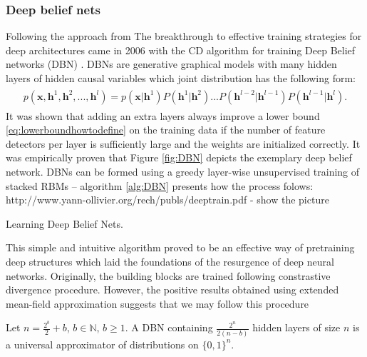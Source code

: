 \documentclass[../report/report.tex]{subfiles}
\begin{document}
\subsubsection{Deep belief nets}
Following the approach from 
The breakthrough to effective training strategies for deep architectures came in 2006 with the CD algorithm for training
Deep Belief networks (DBN) \cite{hinton2006reducing}. DBNs are generative graphical models with many hidden layers of hidden
causal variables which joint distribution has the following form:
\begin{align}
\begin{split}
p(\mathbf{x}, \mathbf{h}^1, \mathbf{h}^2,..., \mathbf{h}^l) = p(\mathbf{x}| \mathbf{h}^1)P(\mathbf{h}^1|\mathbf{h}^2)...
P(\mathbf{h}^{l-2}|\mathbf{h}^{l-1})P(\mathbf{h}^{l-1}|\mathbf{h}^{l}).
\end{split}
\end{align}
It was shown that adding an extra layers always improve a lower bound \ref{eq:lowerboundhowtodefine} on the training data
if the number of feature detectors per layer is sufficiently large and the weights are initialized correctly. It was empirically
proven that Figure \ref{fig:DBN} depicts the exemplary deep belief network.
DBNs can be formed using a greedy layer-wise unsupervised training of stacked RBMs -- algorithm \ref{alg:DBN} presents how the process
folows:
http://www.yann-ollivier.org/rech/publs/deeptrain.pdf - show the picture 
\begin{algorithm}[!bthp]
\caption{Learning Deep Belief Nets.}
\label{alg:DBN}
\begin{algorithmic}
\EndFor
\end{algorithmic}
\end{algorithm}
This simple and intuitive algorithm proved to be an effective way of pretraining deep structures which laid the foundations
of the resurgence of deep neural networks. Originally, the building blocks are trained following constrastive divergence 
procedure.  However, the positive results obtained using extended mean-field approximation 
suggests that we may 
follow this procedure 

\cite{montufar2010refinements}
\begin{theorem} [Guido-Ay, 2010] Let $n = \frac{2^b}{2} + b$, $b \in \mathbb{N}$, $b \geqslant 1$. A DBN containing $\frac{2^n}{2(n-b)}$ hidden layers of size $n$ is a universal approximator of distributions on $\{0,1 \}^n$.
\end{theorem}
\end{document}
